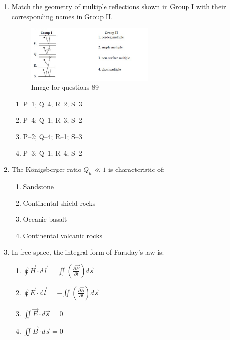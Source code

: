 \documentclass[journal,12pt,onecolumn]{IEEEtran}
\theoremstyle{remark}
\begin{document}
\begin{enumerate}
\item Match the geometry of multiple reflections shown in Group I with their corresponding names in Group II.

\begin{figure}[H]
    \centering
    \includegraphics[width=0.6\textwidth]{figs/fig15.png}
    \caption{Image for questions 89}
    \label{fig:question89}
\end{figure}

\begin{multicols}{2}
\begin{enumerate}
\item P--1; Q--4; R--2; S--3  
\item P--4; Q--1; R--3; S--2  
\item P--2; Q--4; R--1; S--3  
\item P--3; Q--1; R--4; S--2  
\end{enumerate}
\end{multicols}

\item The Königsberger ratio $Q_u \ll 1$ is characteristic of:

\begin{multicols}{2}
\begin{enumerate}
\item Sandstone  
\item Continental shield rocks  
\item Oceanic basalt  
\item Continental volcanic rocks  
\end{enumerate}
\end{multicols}

\item In free-space, the integral form of Faraday's law is:

\begin{multicols}{4}
\begin{enumerate}
\item $\oint \vec{H} \cdot d\vec{l} = \iint \left( \frac{\partial \vec{E}}{\partial t} \right) d\vec{s}$  
\item $\oint \vec{E} \cdot d\vec{l} = - \iint \left( \frac{\partial \vec{B}}{\partial t} \right) d\vec{s}$  
\item $\iint \vec{E} \cdot d\vec{s} = 0$  
\item $\iint \vec{B} \cdot d\vec{s} = 0$  
\end{enumerate}
\end{multicols}


\end{enumerate}
\end{document}
